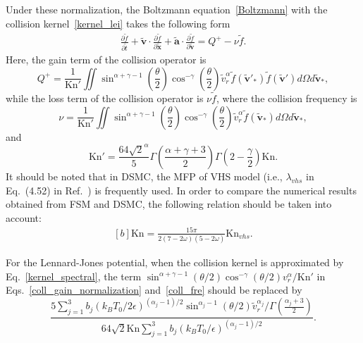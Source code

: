 Under these normalization, the Boltzmann equation~\eqref{Boltzmann} with the collision kernel~\eqref{kernel_lei} takes the following form
\begin{equation}  
\label{Boltzmann_dimensionless}
\begin{aligned}
\frac{\partial \widetilde{f}}{\partial\widetilde{t}}+\widetilde{\bm{v}}\cdot\frac{\partial
\widetilde{f}}{\partial\widetilde{\bm{x}}}+\widetilde{\bm{a}}\cdot\frac{\partial
\widetilde{f}}{\partial \widetilde{\bm{v}}}=Q^+-\nu \tilde{f}.
  \end{aligned}
\end{equation}
Here, the gain term of the collision operator is  
\begin{equation}\label{coll_gain_normalization}
Q^+=\frac{1}{\text{Kn}'}\iint
\sin^{\alpha+\gamma-1}\left(\frac{\theta}{2}\right)\cos^{-\gamma}\left(\frac{\theta}{2}\right)\widetilde{v}_r^\alpha
\widetilde{f}(\widetilde{\bm{v}}'_{\ast})\widetilde{f}(\widetilde{\bm{v}}')d\Omega d\widetilde{\bm{v}}_\ast,
\end{equation}
while the loss term of the collision operator is $\nu\tilde{f}$, where the collision frequency is
\begin{equation}\label{coll_fre}
\nu=\frac{1}{\text{Kn}'}\iint
\sin^{\alpha+\gamma-1}\left(\frac{\theta}{2}\right)\cos^{-\gamma}\left(\frac{\theta}{2}\right)\widetilde{v}_r^\alpha
\widetilde{f}(\widetilde{\bm{v}}_{\ast})d\Omega d\widetilde{\bm{v}}_\ast,
\end{equation}
and 
\begin{equation}\label{Knudsen}
{\text{Kn}'}=\frac{64\sqrt{2}^\alpha}{5}\Gamma\left(\frac{\alpha+\gamma+3}{2}\right)
\Gamma\left(2-\frac{\gamma}{2}\right)\text{Kn}.
\end{equation}
It should be noted that in DSMC, the MFP of VHS model (i.e., $\lambda_{vhs}$ in Eq.~(4.52) in Ref.~\cite{Bird1994}) is frequently used. In order to compare the numerical results obtained from FSM and DSMC, the following relation should be taken into account:
\begin{equation}\label{Kn_VHS}
\begin{aligned}[b]
	\text{Kn}=\frac{15\pi}{2(7-2\omega)(5-2\omega)}\text{Kn}_{vhs}.
	 \end{aligned}
\end{equation} 


For the Lennard-Jones potential, when the collision kernel is approximated by Eq.~\eqref{kernel_spectral}, the term
$\sin^{\alpha+\gamma-1}(\theta/2)\cos^{-\gamma}(\theta/2){v}_r^\alpha/\text{Kn}'$
in Eqs.~\eqref{coll_gain_normalization} and~\eqref{coll_fre} should be replaced by
\begin{equation}\label{LJ_kernel}
\frac{5\sum_{j=1}^3{}b_j  (k_BT_0/2\epsilon)^{(\alpha_j-1)/2} \sin^{\alpha_j-1}({\theta}/{2})
	\widetilde{v}_r^{\alpha_j}/{\Gamma(\frac{\alpha_j+3}{2})}}
{64\sqrt{2}\text{Kn}\sum_{j=1}^3b_j(k_BT_0/\epsilon)^{(\alpha_j-1)/2}}.
\end{equation}


